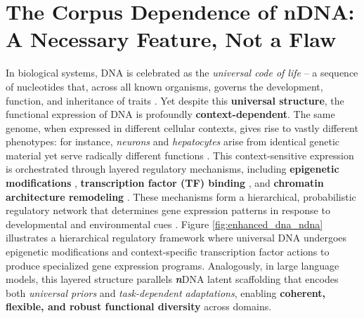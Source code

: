 \section{The Corpus Dependence of nDNA: A Necessary Feature, Not a Flaw}

In biological systems, DNA is celebrated as the \emph{universal code of life} -- a sequence of nucleotides that, across all known organisms, governs the development, function, and inheritance of traits \citep{alberts2014molecular, lewin2013genes}. 
Yet despite this \textbf{universal structure}, the functional expression of DNA is profoundly \textbf{context-dependent}. The same genome, when expressed in different cellular contexts, gives rise to vastly different phenotypes: for instance, \textit{neurons} and \textit{hepatocytes} arise from identical genetic material yet serve radically different functions \citep{bird2007perceptions, davidson2006gene}. 
This context-sensitive expression is orchestrated through layered regulatory mechanisms, including \textbf{epigenetic modifications} \citep{bird2007perceptions}, \textbf{transcription factor (TF) binding} \citep{lambert2018human}, and \textbf{chromatin architecture remodeling} \citep{clapier2017mechanisms, dekker2013exploring}. 
These mechanisms form a hierarchical, probabilistic regulatory network that determines gene expression patterns in response to developmental and environmental cues \citep{alon2006introduction}. Figure \ref{fig:enhanced_dna_ndna} illustrates a hierarchical regulatory framework where universal DNA undergoes epigenetic modifications and context-specific transcription factor actions to produce specialized gene expression programs. Analogously, in large language models, this layered structure parallels \textbf{\textit{n}}DNA latent scaffolding that encodes both \emph{universal priors} and \emph{task-dependent adaptations}, enabling \textbf{coherent, flexible, and robust functional diversity} across domains.



